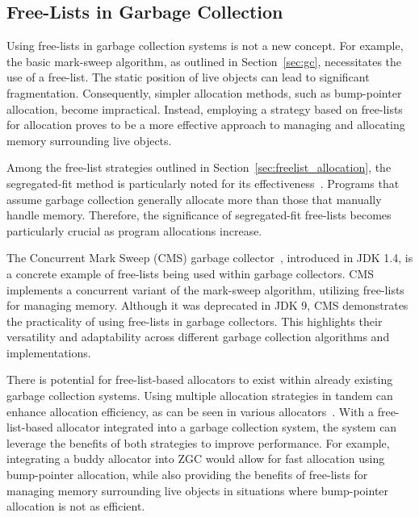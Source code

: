 \subsection{Free-Lists in Garbage Collection}

Using free-lists in garbage collection systems is not a new concept. For example, the basic mark-sweep algorithm, as outlined in Section~\ref{sec:gc}, necessitates the use of a free-list. The static position of live objects can lead to significant fragmentation. Consequently, simpler allocation methods, such as bump-pointer allocation, become impractical. Instead, employing a strategy based on free-lists for allocation proves to be a more effective approach to managing and allocating memory surrounding live objects.

Among the free-list strategies outlined in Section~\ref{sec:freelist_allocation}, the segregated-fit method is particularly noted for its effectiveness~\cite{gchandbook}. Programs that assume garbage collection generally allocate more than those that manually handle memory. Therefore, the significance of segregated-fit free-lists becomes particularly crucial as program allocations increase.

The Concurrent Mark Sweep (CMS) garbage collector~\cite{cms}, introduced in JDK 1.4, is a concrete example of free-lists being used within garbage collectors. CMS implements a concurrent variant of the mark-sweep algorithm, utilizing free-lists for managing memory. Although it was deprecated in JDK 9, CMS demonstrates the practicality of using free-lists in garbage collectors. This highlights their versatility and adaptability across different garbage collection algorithms and implementations.

There is potential for free-list-based allocators to exist within already existing garbage collection systems. Using multiple allocation strategies in tandem can enhance allocation efficiency, as can be seen in various allocators~\cite{jemalloc}. With a free-list-based allocator integrated into a garbage collection system, the system can leverage the benefits of both strategies to improve performance. For example, integrating a buddy allocator into ZGC would allow for fast allocation using bump-pointer allocation, while also providing the benefits of free-lists for managing memory surrounding live objects in situations where bump-pointer allocation is not as efficient.

